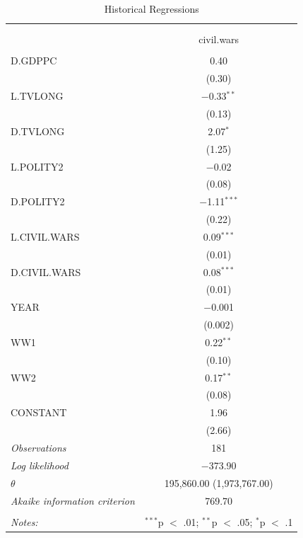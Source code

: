 \documentclass[11pt,article,oneside]{memoir}
\begin{document}
\begin{table}[!htbp] \centering 
  \caption{Historical Regressions} 
  \label{} 
\footnotesize 
\begin{tabular}{@{\extracolsep{5pt}}lc} 
\\[-1.8ex]\hline \\[-1.8ex] 
\\[-1.8ex] & civil.wars \\ 
\hline \\[-1.8ex] 
 D.GDPPC & 0.40 \\ 
  & (0.30) \\ 
  L.TVLONG & $-$0.33$^{**}$ \\ 
  & (0.13) \\ 
  D.TVLONG & 2.07$^{*}$ \\ 
  & (1.25) \\ 
  L.POLITY2 & $-$0.02 \\ 
  & (0.08) \\ 
  D.POLITY2 & $-$1.11$^{***}$ \\ 
  & (0.22) \\ 
  L.CIVIL.WARS & 0.09$^{***}$ \\ 
  & (0.01) \\ 
  D.CIVIL.WARS & 0.08$^{***}$ \\ 
  & (0.01) \\ 
  YEAR & $-$0.001 \\ 
  & (0.002) \\ 
  WW1 & 0.22$^{**}$ \\ 
  & (0.10) \\ 
  WW2 & 0.17$^{**}$ \\ 
  & (0.08) \\ 
  CONSTANT & 1.96 \\ 
  & (2.66) \\ 
 \textit{Observations} & 181 \\ 
\textit{Log likelihood} & $-$373.90 \\ 
$\theta$ & 195,860.00  (1,973,767.00) \\ 
\textit{Akaike information criterion} & 769.70 \\ 
\hline \\[-1.8ex] 
\textit{Notes:} & \multicolumn{1}{l}{$^{***}$p $<$ .01; $^{**}$p $<$ .05; $^{*}$p $<$ .1} \\ 
\end{tabular} 
\end{table}
\end{document}
